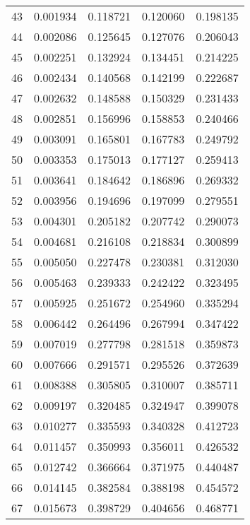 \begin{center}
\begin{tabular}{|c|c|c|c|c|}
    43    & 0.001934   & 0.118721     & 0.120060     & 0.198135 \\ 
    44    & 0.002086   & 0.125645     & 0.127076     & 0.206043 \\ 
    45    & 0.002251   & 0.132924     & 0.134451     & 0.214225 \\ 
    46    & 0.002434   & 0.140568     & 0.142199     & 0.222687 \\ 
    47    & 0.002632   & 0.148588     & 0.150329     & 0.231433 \\ 
    48    & 0.002851   & 0.156996     & 0.158853     & 0.240466 \\ 
    49    & 0.003091   & 0.165801     & 0.167783     & 0.249792 \\ 
    50    & 0.003353   & 0.175013     & 0.177127     & 0.259413 \\ 
    51    & 0.003641   & 0.184642     & 0.186896     & 0.269332 \\ 
    52    & 0.003956   & 0.194696     & 0.197099     & 0.279551 \\ 
    53    & 0.004301   & 0.205182     & 0.207742     & 0.290073 \\ 
    54    & 0.004681   & 0.216108     & 0.218834     & 0.300899 \\ 
    55    & 0.005050   & 0.227478     & 0.230381     & 0.312030 \\ 
    56    & 0.005463   & 0.239333     & 0.242422     & 0.323495 \\ 
    57    & 0.005925   & 0.251672     & 0.254960     & 0.335294 \\ 
    58    & 0.006442   & 0.264496     & 0.267994     & 0.347422 \\ 
    59    & 0.007019   & 0.277798     & 0.281518     & 0.359873 \\ 
    60    & 0.007666   & 0.291571     & 0.295526     & 0.372639 \\ 
    61    & 0.008388   & 0.305805     & 0.310007     & 0.385711 \\ 
    62    & 0.009197   & 0.320485     & 0.324947     & 0.399078 \\ 
    63    & 0.010277   & 0.335593     & 0.340328     & 0.412723 \\ 
    64    & 0.011457   & 0.350993     & 0.356011     & 0.426532 \\ 
    65    & 0.012742   & 0.366664     & 0.371975     & 0.440487 \\ 
    66    & 0.014145   & 0.382584     & 0.388198     & 0.454572 \\ 
    67    & 0.015673   & 0.398729     & 0.404656     & 0.468771 \\ 

\end{tabular}
\end{center}
